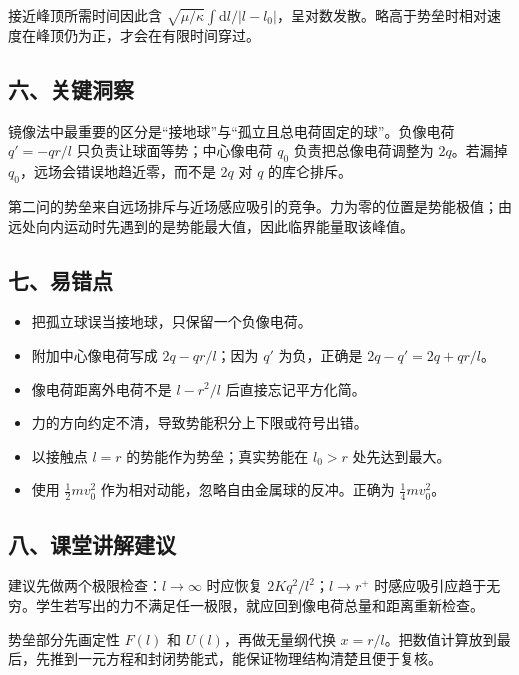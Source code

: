 \documentclass[12pt,a4paper,UTF8]{ctexart}
\newcommand{\tightlist}{\setlength{\itemsep}{0pt}\setlength{\parskip}{0pt}}
\begin{document}
接近峰顶所需时间因此含
\(\sqrt{\mu/\kappa}\int\mathrm dl/|l-l_0|\)，呈对数发散。略高于势垒时相对速度在峰顶仍为正，才会在有限时间穿过。

\subsection{六、关键洞察}\label{ux516dux5173ux952eux6d1eux5bdf-3}

镜像法中最重要的区分是``接地球''与``孤立且总电荷固定的球''。负像电荷
\(q'=-qr/l\) 只负责让球面等势；中心像电荷 \(q_0\) 负责把总像电荷调整为
\(2q\)。若漏掉 \(q_0\)，远场会错误地趋近零，而不是 \(2q\) 对 \(q\)
的库仑排斥。

第二问的势垒来自远场排斥与近场感应吸引的竞争。力为零的位置是势能极值；由远处向内运动时先遇到的是势能最大值，因此临界能量取该峰值。

\subsection{七、易错点}\label{ux4e03ux6613ux9519ux70b9-3}

\begin{itemize}
\tightlist
\item
  把孤立球误当接地球，只保留一个负像电荷。
\item
  附加中心像电荷写成 \(2q-qr/l\)；因为 \(q'\) 为负，正确是
  \(2q- q'=2q+qr/l\)。
\item
  像电荷距离外电荷不是 \(l-r^2/l\) 后直接忘记平方化简。
\item
  力的方向约定不清，导致势能积分上下限或符号出错。
\item
  以接触点 \(l=r\) 的势能作为势垒；真实势能在 \(l_0>r\) 处先达到最大。
\item
  使用 \(\frac12mv_0^2\) 作为相对动能，忽略自由金属球的反冲。正确为
  \(\frac14mv_0^2\)。
\end{itemize}

\subsection{八、课堂讲解建议}\label{ux516bux8bfeux5802ux8bb2ux89e3ux5efaux8bae-3}

建议先做两个极限检查：\(l\to\infty\) 时应恢复
\(2Kq^2/l^2\)；\(l\to r^+\)
时感应吸引应趋于无穷。学生若写出的力不满足任一极限，就应回到像电荷总量和距离重新检查。

势垒部分先画定性 \(F(l)\) 和 \(U(l)\)，再做无量纲代换
\(x=r/l\)。把数值计算放到最后，先推到一元方程和封闭势能式，能保证物理结构清楚且便于复核。
\end{document}

